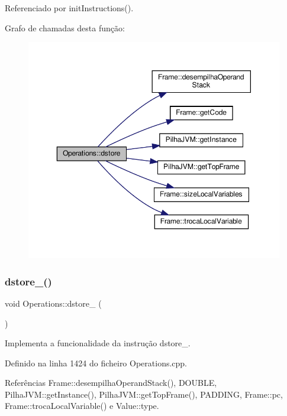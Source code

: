 Referenciado por init\+Instructions().

Grafo de chamadas desta função\+:
\nopagebreak
\begin{figure}[H]
\begin{center}
\leavevmode
\includegraphics[width=350pt]{classOperations_a83fb57afed30b1223f8485492f9d9958_cgraph}
\end{center}
\end{figure}
\mbox{\label{classOperations_a54dd25692395f6671a3a8e21c73eef6d}} 
\subsubsection{\texorpdfstring{dstore\+\_()}{dstore\_0()}}
{\footnotesize\ttfamily void Operations\+::dstore\+\_ (\begin{DoxyParamCaption}{ }\end{DoxyParamCaption})\hspace{0.3cm}{\ttfamily [private]}}



Implementa a funcionalidade da instrução dstore\+\_. 



Definido na linha 1424 do ficheiro Operations.\+cpp.



Referências Frame\+::desempilha\+Operand\+Stack(), D\+O\+U\+B\+LE, Pilha\+J\+V\+M\+::get\+Instance(), Pilha\+J\+V\+M\+::get\+Top\+Frame(), P\+A\+D\+D\+I\+NG, Frame\+::pc, Frame\+::troca\+Local\+Variable() e Value\+::type.



